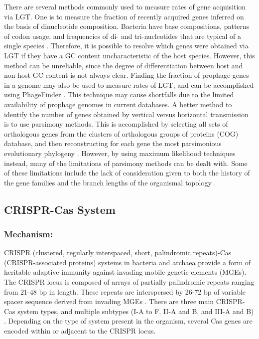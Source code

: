 \documentclass[english]{article}
\newcommand{\cs}[0]{CRISPR-Cas }
\begin{document}
There are several methods commonly used to measure rates of gene
acquisition via LGT. One is to measure the fraction of recently acquired
genes inferred on the basis of dinucleotide composition. Bacteria
have base compositions, patterns of codon usage, and frequencies
of di- and tri-nucleotides that are typical of a single species
\citep{Goph:15}. Therefore, it is possible to resolve which genes were
obtained via LGT if they have a GC content uncharacteristic of the
host species. However, this method can be unreliable, since the degree
of differentiation between host and non-host GC content is not always
clear. Finding the fraction of prophage genes in a genome may also be
used to measure rates of LGT, and can be accomplished using PhageFinder
\citep{Goph:15}. This technique may cause shortfalls due to the limited
availability of prophage genomes in current databases. A better method
to identify the number of genes obtained by vertical versus horizontal
transmission is to use parsimony methods. This is accomplished by
selecting all sets of orthologous genes from the clusters of orthologous
groups of proteins (COG) database, and then reconstructing for each gene
the most parsimonious evolutionary phylogeny \citep{Phil:03}. However,
by using maximum likelihood techniques instead, many of the limitations
of parsimony methods can be dealt with. Some of these limitations include
the lack of consideration given to both the history of the gene families and
the branch lengths of the organismal topology \citep{Phil:03}.

\subsection{CRISPR-Cas System}

\subsubsection{Mechanism:}

CRISPR (clustered, regularly interspaced, short, palindromic
repeats)-Cas (CRISPR-associated proteins) systems in bacteria and
archaea provide a form of heritable adaptive immunity against invading
mobile genetic elements (MGEs). The CRISPR locus is composed of arrays
of partially palindromic repeats ranging from 21-48 bp in length.
These repeats are interspersed by 26-72 bp of variable spacer sequence
derived from invading MGEs \citep{Bond:14}. There are three main \cs system
types, and multiple subtypes (I-A to F, II-A and B, and III-A and
B) \citep{Pawl:14}. Depending on the type of system present in
the organism, several Cas genes are encoded within or adjacent to
the CRISPR locus. 
\end{document}
